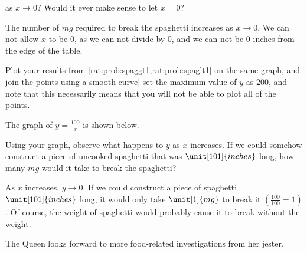\begin{problem}
\begin{subproblem}
	as $x\rightarrow 0$? Would it ever make sense to let $x=0$?
	\begin{shortsolution}
		The number of $\unit{mg}$ required to break the spaghetti increases as $x\rightarrow 0$.
		We can not allow $x$ to be $0$, as we can not divide by $0$, and we can not 
		be $0$ inches from the edge of the table.
	\end{shortsolution}
\end{subproblem}
\begin{subproblem}
	Plot your results from \cref{rat:prob:spaggt1,rat:prob:spaglt1} on the same graph, 
	and join the points using a smooth curve| set the maximum value of $y$ as $200$, and 
	note that this necessarily means that you will not be able to plot all of the points.
	\begin{shortsolution}
		The graph of $y=\frac{100}{x}$ is shown below.
		
	\end{shortsolution}
\end{subproblem}
\begin{subproblem}
	Using your graph, observe what happens to $y$ as $x$ increases. If we could somehow
	construct a piece of uncooked spaghetti that was $\unit[101]{inches}$ long, how many 
	$\unit{mg}$ would it take to break the spaghetti?
	\begin{shortsolution}
		As $x$ increases, $y\rightarrow 0$. If we could construct a piece of spaghetti 
		$\unit[101]{inches}$ long, it would only take $\unit[1]{mg}$ to break it $\left(\frac{100}{100}=1\right)$. Of course, 
		the weight of spaghetti would probably cause it to break without the weight.
	\end{shortsolution}
\end{subproblem}
The Queen looks forward to more food-related investigations from her jester.
\end{problem}



